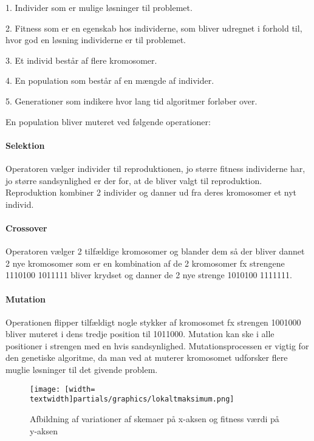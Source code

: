 1.	Individer som er mulige løsninger til problemet.


2.	Fitness som er en egenskab hos individerne, som bliver udregnet i forhold til, hvor god en løsning individerne er til problemet.


3.	Et individ består af flere kromosomer.


4.	En population som består af en mængde af individer.


5.	Generationer som indikere hvor lang tid algoritmer forløber over.


En population bliver muteret ved følgende operationer:

\paragraph{Selektion}

Operatoren vælger individer til reproduktionen, jo større fitness individerne har, jo større sandsynlighed er der for, at de bliver valgt til reproduktion. Reproduktion kombiner 2 individer og danner ud fra deres kromosomer et nyt individ.

\paragraph{Crossover}

Operatoren vælger 2 tilfældige kromosomer og blander dem så der bliver dannet 2 nye kromosomer som er en kombination af de 2 kromosomer fx strengene 1110100 1011111 bliver krydset og danner de 2 nye strenge 1010100 1111111.

\paragraph{Mutation}

Operationen flipper tilfældigt nogle stykker af kromosomet fx strengen 1001000 bliver muteret i dens tredje position til 1011000. Mutation kan ske i alle positioner i strengen med en hvis sandsynlighed. Mutationsprocessen er vigtig for den genetiske algoritme, da man ved at muterer kromosomet udforsker flere muglie løsninger til det givende problem.
\begin{figure}[!h]
  \texttt{[image: [width=\\textwidth]partials/graphics/lokaltmaksimum.png]}
  \caption{Afbildning af variationer af skemaer på x-aksen og fitness værdi på y-aksen}
  \label{fig:Lokalmax}
\end{figure}

